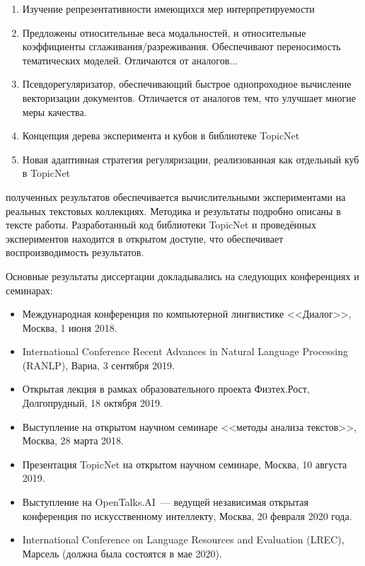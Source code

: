 {}
\begin{enumerate}[beginpenalty=10000] %
  \item Изучение репрезентативности имеющихся мер интерпретируемости
  \item Предложены относительные веса модальностей, и относительные коэффициенты сглаживания/разреживания. Обеспечивают переносимость тематических моделей. Отличаются от аналогов...
  \item Псевдорегуляризатор, обеспечивающий быстрое однопроходное вычисление векторизации документов. Отличается от аналогов тем, что улучшает многие меры качества.
  \item Концепция дерева эксперимента и кубов в библиотеке TopicNet
  \item Новая адаптивная стратегия регуляризации, реализованная как отдельный куб в TopicNet
\end{enumerate}

{\reliability} полученных результатов обеспечивается вычислительными экспериментами на реальных текстовых коллекциях. Методика и результаты подробно описаны в тексте работы. Разработанный код библиотеки TopicNet и проведённых экспериментов находится в открытом доступе, что обеспечивает воспроизводимость результатов.  

{\probation}
Основные результаты диссертации докладывались на следующих конференциях и семинарах:
\begin{itemize}
    \item Международная конференция по компьютерной лингвистике <<Диалог>>, Москва, 1 июня 2018.
    \item International Conference Recent Advances in Natural Language Processing (RANLP), Варна, 3 сентября 2019.
    \item Открытая лекция в рамках образовательного проекта Физтех.Рост, Долгопрудный, 18 октября 2019.
    \item Выступление на открытом научном семинаре <<методы анализа текстов>>, Москва, 28 марта 2018.
    \item Презентация TopicNet на открытом научном семинаре, Москва, 10 августа 2019.
    \item Выступление на OpenTalks.AI~--- ведущей независимая открытая конференция по искусственному интеллекту, Москва, 20 февраля 2020 года.
    \item International Conference on Language Resources and Evaluation (LREC), Марсель (должна была состоятся в мае 2020).
\end{itemize}

